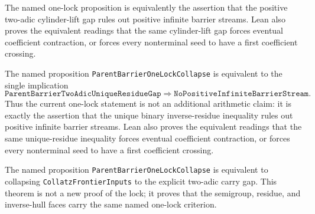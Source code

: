\begin{theorem}
  \label{thm:collatz-two-adic-cylinder-lift-one-lock-implication}
  \leanok
  The named one-lock proposition is equivalently the assertion that the
  positive two-adic cylinder-lift gap rules out positive infinite barrier
  streams. Lean also proves the equivalent readings that the same cylinder-lift
  gap forces eventual coefficient contraction, or forces every nonterminal seed
  to have a first coefficient crossing.
\end{theorem}
\begin{theorem}
  \label{thm:collatz-two-adic-unique-one-lock-implication}
  \leanok
  The named proposition \texttt{ParentBarrierOneLockCollapse} is equivalent to the
  single implication
  \[
    \texttt{ParentBarrierTwoAdicUniqueResidueGap}
      \Longrightarrow \texttt{NoPositiveInfiniteBarrierStream}.
  \]
  Thus the current one-lock statement is not an additional arithmetic claim:
  it is exactly the assertion that the unique binary inverse-residue inequality
  rules out positive infinite barrier streams. Lean also proves the equivalent
  readings that the same unique-residue inequality forces eventual coefficient
  contraction, or forces every nonterminal seed to have a first coefficient
  crossing.
\end{theorem}
\begin{theorem}
  \label{thm:collatz-two-adic-named-collapse}
  \leanok
  The named proposition \texttt{ParentBarrierOneLockCollapse} is equivalent to
  collapsing \texttt{CollatzFrontierInputs} to the explicit two-adic carry gap.
  This theorem is not a new proof of the lock; it proves that the semigroup,
  residue, and inverse-hull faces carry the same named one-lock criterion.
\end{theorem}
